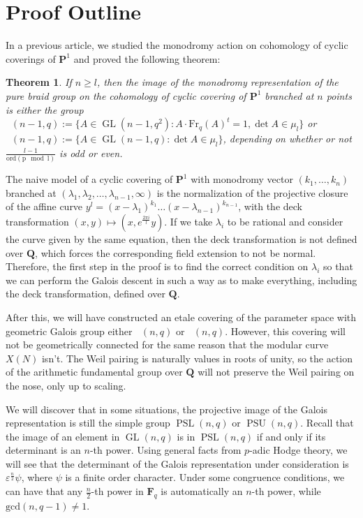 \documentclass{article}
\newtheorem{theorem}{Theorem}
\theoremstyle{definition}
\DeclareMathOperator{\GL}{\mathrm{GL}}
\DeclareMathOperator{\PSL}{\mathrm{PSL}}
\DeclareMathOperator{\PSU}{\mathrm{PSU}}
\DeclareMathOperator{\SlU}{\mathrm{S}_{\mathit{l}}\mathrm{U}}
\DeclareMathOperator{\SlL}{\mathrm{S}_{\mathit{l}}\mathrm{L}}
\begin{document}
	\section{Proof Outline}
	In a previous article, we studied the monodromy action on cohomology of cyclic coverings of $\mathbf{P}^1$ and proved the following theorem:	
	\begin{theorem}
		If $n \geq l$, then the image of the monodromy representation of the pure braid group on the cohomology of cyclic covering of $\mathbf{P}^1$ branched at $n$ points is either the group $\SlU(n-1,q) := \{A \in \GL(n-1,q^2) : A \cdot \mathrm{Fr}_q(A)^t = 1, \det A \in \mu_l \}$ or $\SlL(n-1,q) := \{A \in \GL(n-1,q) : \det A \in \mu_l\}$, depending on whether or not $\frac{l-1}{\mathrm{ord (p \mod l)}}$ is odd or even.
	\end{theorem}
	The naive model of a cyclic covering of $\mathbf{P}^1$ with monodromy vector $(k_1, \ldots, k_n)$ branched at $(\lambda_1, \lambda_2, \ldots, \lambda_{n-1}, \infty)$ is the normalization of the projective closure of the affine curve $y ^ l = (x - \lambda_1)^{k_1} \ldots (x - \lambda_{n-1})^{k_{n-1}}$, with the deck transformation $(x, y) \mapsto (x, e^{\frac{2 \pi i}{l}} y)$. If we take $\lambda_i$ to be rational and consider the curve given by the same equation, then the deck transformation is not defined over $\mathbf{Q}$, which forces the corresponding field extension to not be normal. Therefore, the first step in the proof is to find the correct condition on $\lambda_i$ so that we can perform the Galois descent in such a way as to make everything, including the deck transformation, defined over $\mathbf{Q}$. \par 
	After this, we will have constructed an etale covering of the parameter space with geometric Galois group either $\SlU(n, q)$ or $\SlL(n, q)$. However, this covering will not be geometrically connected for the same reason that the modular curve $X(N)$ isn't. The Weil pairing is naturally values in roots of unity, so the action of the arithmetic fundamental group over $\mathbf{Q}$ will not preserve the Weil pairing on the nose, only up to scaling. \par 
	We will discover that in some situations, the projective image of the Galois representation is still the simple group $\PSL(n, q)$ or $\PSU(n, q)$. Recall that the image of an element in $\GL(n, q)$ is in $\PSL(n, q)$ if and only if its determinant is an $n$-th power. Using general facts from $p$-adic Hodge theory, we will see that the determinant of the Galois representation under consideration is $\varepsilon ^ {\frac{n}{2}} \psi$, where $\psi$ is a finite order character. Under some congruence conditions, we can have that any $\frac{n}{2}$-th power in $\mathbf{F}_q$ is automatically an $n$-th power, while $\mathrm{gcd}(n , q - 1) \neq 1$. \par 
\end{document}
